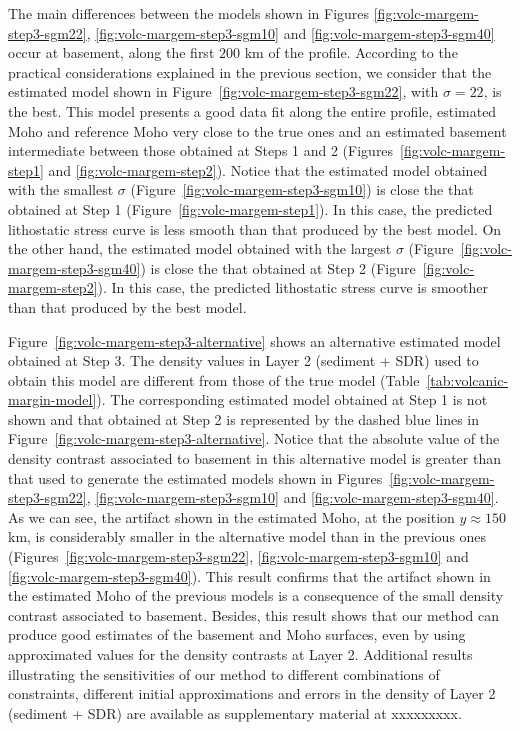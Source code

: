 \documentclass[manuscript]{geophysics}
\begin{document}
The main differences between the models shown in 
Figures \ref{fig:volc-margem-step3-sgm22}, \ref{fig:volc-margem-step3-sgm10} and 
\ref{fig:volc-margem-step3-sgm40} occur at basement,
along the first $200$ km of the profile.
According to the practical considerations explained in the previous section, 
we consider that the estimated model shown in Figure~\ref{fig:volc-margem-step3-sgm22},
with $\sigma = 22$, is the best. 
This model presents a good data fit along the entire profile, estimated Moho and
reference Moho very close to the true ones and an estimated basement intermediate
between those obtained at Steps 1 and 2 (Figures~\ref{fig:volc-margem-step1} and
\ref{fig:volc-margem-step2}).
Notice that the estimated model obtained with 
the smallest $\sigma$ (Figure~\ref{fig:volc-margem-step3-sgm10}) is close the that 
obtained at Step 1 (Figure~\ref{fig:volc-margem-step1}).
In this case, the predicted lithostatic stress curve is less smooth than that
produced by the best model.
On the other hand, the estimated model obtained with 
the largest $\sigma$ (Figure~\ref{fig:volc-margem-step3-sgm40}) is close the that 
obtained at Step 2 (Figure~\ref{fig:volc-margem-step2}).
In this case, the predicted lithostatic stress curve is smoother than that
produced by the best model.

Figure~\ref{fig:volc-margem-step3-alternative} shows an alternative 
estimated model obtained at Step 3.
The density values in Layer 2 (sediment + SDR) used to obtain this model 
are different from those of the true model (Table~\ref{tab:volcanic-margin-model}).
The corresponding estimated model obtained at Step 1 is not shown and
that obtained at Step 2 is represented by the dashed blue lines in
Figure~\ref{fig:volc-margem-step3-alternative}.
Notice that the absolute value of the density contrast associated to basement 
in this alternative model is greater than that used to generate the estimated models shown in 
Figures~\ref{fig:volc-margem-step3-sgm22}, \ref{fig:volc-margem-step3-sgm10} and
\ref{fig:volc-margem-step3-sgm40}. As we can see, the artifact shown in the estimated Moho,
at the position $y \approx 150$ km, is considerably smaller in the alternative model than
in the previous ones (Figures~\ref{fig:volc-margem-step3-sgm22}, \ref{fig:volc-margem-step3-sgm10} and
\ref{fig:volc-margem-step3-sgm40}). This result confirms that the artifact shown in the
estimated Moho of the previous models is a consequence of the small density contrast
associated to basement.
Besides, this result shows that our method can produce good estimates of the basement and
Moho surfaces, even by using approximated values for the density contrasts at Layer 2.
Additional results illustrating the sensitivities of our method to different combinations 
of constraints, different initial approximations and errors in the density of Layer 2 
(sediment + SDR) are available as supplementary material at xxxxxxxxx.
\end{document}
